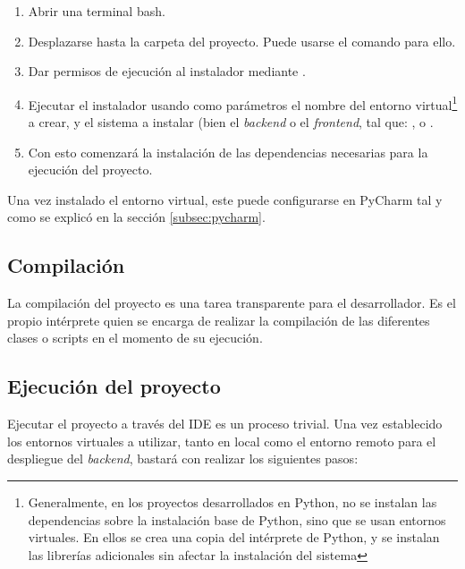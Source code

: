 \begin{enumerate}
\item Abrir una terminal bash.
\item Desplazarse hasta la carpeta del proyecto. Puede usarse el comando  para ello.
\item Dar permisos de ejecución al instalador mediante .
\item Ejecutar el instalador usando como parámetros el nombre del entorno virtual\footnote{Generalmente, en los proyectos desarrollados en Python, no se instalan las dependencias sobre la instalación base de Python, sino que se usan entornos virtuales. En ellos se crea una copia del intérprete de Python, y se instalan las librerías adicionales sin afectar la instalación del sistema} a crear, y el sistema a instalar (bien el \emph{backend} o el \emph{frontend}, tal que: , o .
\item Con esto comenzará la instalación de las dependencias necesarias para la ejecución del proyecto. 
\end{enumerate}

Una vez instalado el entorno virtual, este puede configurarse en PyCharm tal y como se explicó en la sección \ref{subsec:pycharm}.


\subsection{Compilación}

La compilación del proyecto es una tarea transparente para el desarrollador. Es el propio intérprete quien se encarga de realizar la compilación de las diferentes clases o scripts en el momento de su ejecución. 

\subsection{Ejecución del proyecto}

Ejecutar el proyecto a través del IDE es un proceso trivial. Una vez establecido los entornos virtuales a utilizar, tanto en local como el entorno remoto para el despliegue del \emph{backend}, bastará con realizar los siguientes pasos: 

